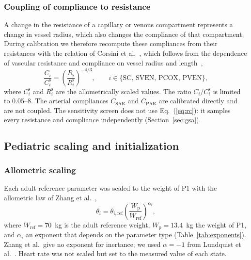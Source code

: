 \subsubsection{Coupling of compliance to resistance}
\label{sec:rc}
A change in the resistance of a capillary or venous compartment represents a change in vessel radius, which also changes the compliance of that compartment. During calibration we therefore recompute these compliances from their resistances with the relation of Corsini et al.~\cite{Corsini2014}, which follows from the dependence of vascular resistance and compliance on vessel radius and length~\cite{Pennati2000},
\begin{equation}
\frac{C_i}{C_i^{\mathrm{s}}} = \left(\frac{R_i}{R_i^{\mathrm{s}}}\right)^{-4/3}, \qquad i \in \{\mathrm{SC},\,\mathrm{SVEN},\,\mathrm{PCOX},\,\mathrm{PVEN}\},
\label{eq:rc}
\end{equation}
where $C_i^{\mathrm{s}}$ and $R_i^{\mathrm{s}}$ are the allometrically scaled values. The ratio $C_i/C_i^{\mathrm{s}}$ is limited to 0.05--8. The arterial compliances $C_{\mathrm{SAR}}$ and $C_{\mathrm{PAR}}$ are calibrated directly and are not coupled. The sensitivity screen does not use Eq.~(\ref{eq:rc}): it samples every resistance and compliance independently (Section~\ref{sec:gsa}).

\FloatBarrier
\subsection{Pediatric scaling and initialization}
\label{sec:scaling}

\subsubsection{Allometric scaling}
Each adult reference parameter was scaled to the weight of P1 with the allometric law of Zhang et al.~\cite{zhang2019multiscale},
\begin{equation}
\theta_i = \theta_{i,\mathrm{ref}} \left(\frac{W_{\mathrm{p}}}{W_{\mathrm{ref}}}\right)^{\alpha_i},
\label{eq:scaling}
\end{equation}
where $W_{\mathrm{ref}} = 70$~kg is the adult reference weight, $W_{\mathrm{p}} = 13.4$~kg the weight of P1, and $\alpha_i$ an exponent that depends on the parameter type (Table~\ref{tab:exponents}). Zhang et al.\ give no exponent for inertance; we used $\alpha = -1$ from Lundquist et al.~\cite{Lundquist2025}. Heart rate was not scaled but set to the measured value of each state.

